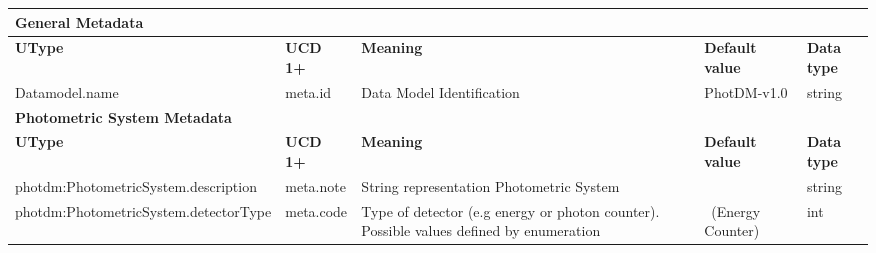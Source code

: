 \documentclass[11pt,a4paper]{ivoa}
\begin{document}
\begin{appendices}
\begin{table}[H]
 			\centering
 			\begin{adjustbox}{angle=90}
\begin{tabular}{p{2.5in}|p{1.5in}|p{2in}|p{0.74in}|p{0.35in}}
\multicolumn{5}{p{\dimexpr6.59in+8\tabcolsep\relax}}{\centering
{\fontsize{8pt}{8pt}\selectfont \textbf{General Metadata}}} \\
\hline
\multicolumn{1}{p{2.5in}}{{\fontsize{8pt}{8pt}\selectfont \textbf{UType}}} &
\multicolumn{1}{p{1.5in}}{{\fontsize{8pt}{8pt}\selectfont \textbf{UCD 1+}}} &
\multicolumn{1}{p{2in}}{{\fontsize{8pt}{8pt}\selectfont \textbf{Meaning}}} &
\multicolumn{1}{p{0.74in}}{{\fontsize{8pt}{8pt}\selectfont \textbf{Default value}}} &
\multicolumn{1}{p{0.35in}}{{\fontsize{8pt}{8pt}\selectfont \textbf{Data type}}} \\
\hline
\multicolumn{1}{p{2.5in}}{{\fontsize{8pt}{8pt}\selectfont Datamodel.name}} &
\multicolumn{1}{p{1.5in}}{{\fontsize{8pt}{8pt}\selectfont meta.id }} &
\multicolumn{1}{p{2in}}{{\fontsize{8pt}{8pt}\selectfont Data Model Identification }} &
\multicolumn{1}{p{0.74in}}{{\fontsize{8pt}{8pt}\selectfont PhotDM-v1.0}} &
\multicolumn{1}{p{0.35in}}{{\fontsize{8pt}{8pt}\selectfont string}} \\
\hline
\multicolumn{5}{p{\dimexpr6.59in+8\tabcolsep\relax}}{\centering
{\fontsize{8pt}{8pt}\selectfont \textbf{Photometric System Metadata}}} \\
\hline
\multicolumn{1}{p{2.5in}}{{\fontsize{8pt}{8pt}\selectfont \textbf{UType}}} &
\multicolumn{1}{p{1.5in}}{{\fontsize{8pt}{8pt}\selectfont \textbf{UCD 1+}}} &
\multicolumn{1}{p{2in}}{{\fontsize{8pt}{8pt}\selectfont \textbf{Meaning}}} &
\multicolumn{1}{p{0.74in}}{{\fontsize{8pt}{8pt}\selectfont \textbf{Default value}}} &
\multicolumn{1}{p{0.35in}}{{\fontsize{8pt}{8pt}\selectfont \textbf{Data type}}} \\
\hline
\multicolumn{1}{p{2.5in}}{{\fontsize{8pt}{8pt}\selectfont photdm:PhotometricSystem.description}} &
\multicolumn{1}{p{1.5in}}{{\fontsize{8pt}{8pt}\selectfont meta.note }} &
\multicolumn{1}{p{2in}}{{\fontsize{8pt}{8pt}\selectfont String representation Photometric System}} &
\multicolumn{1}{p{0.74in}}{} &
\multicolumn{1}{p{0.35in}}{{\fontsize{8pt}{8pt}\selectfont string}} \\
\hline
\multicolumn{1}{p{2.5in}}{{\fontsize{8pt}{8pt}\selectfont photdm:PhotometricSystem.detectorType}} &
\multicolumn{1}{p{1.5in}}{{\fontsize{8pt}{8pt}\selectfont meta.code }} &
\multicolumn{1}{p{2in}}{{\fontsize{8pt}{8pt}\selectfont Type of detector
(e.g energy or photon counter). Possible values defined by enumeration}} &
\multicolumn{1}{p{0.74in}}{{\fontsize{8pt}{8pt}\selectfont 0\  (Energy Counter)}} &
\multicolumn{1}{p{0.35in}}{{\fontsize{8pt}{8pt}\selectfont int}} \\
\hline
\end{tabular}
\end{adjustbox}
 \end{table}


\end{appendices}
\end{document}
